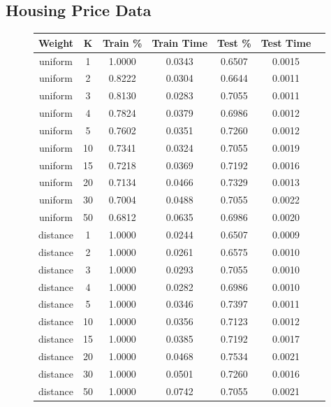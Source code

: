 \documentclass[h]{article}
\begin{document}
\subsection*{Housing Price Data}

\begin{figure}[H]
\begin{tabular}{ | c | c  | c | c | c | c | c |} 
\hline

\textbf{Weight} & \textbf{K} & \textbf{Train \%} & \textbf{Train Time} & \textbf{Test \%} & \textbf{Test Time}   \\ \hline
uniform & 1 & 1.0000 & 0.0343 & 0.6507 & 0.0015 \\ \hline
uniform & 2 & 0.8222 & 0.0304 & 0.6644 & 0.0011 \\ \hline
uniform & 3 & 0.8130 & 0.0283 & 0.7055 & 0.0011 \\ \hline
uniform & 4 & 0.7824 & 0.0379 & 0.6986 & 0.0012 \\ \hline
uniform & 5 & 0.7602 & 0.0351 & 0.7260 & 0.0012 \\ \hline
uniform & 10 & 0.7341 & 0.0324 & 0.7055 & 0.0019 \\ \hline
uniform & 15 & 0.7218 & 0.0369 & 0.7192 & 0.0016 \\ \hline
uniform & 20 & 0.7134 & 0.0466 & 0.7329 & 0.0013 \\ \hline
uniform & 30 & 0.7004 & 0.0488 & 0.7055 & 0.0022 \\ \hline
uniform & 50 & 0.6812 & 0.0635 & 0.6986 & 0.0020 \\ \hline
distance & 1 & 1.0000 & 0.0244 & 0.6507 & 0.0009 \\ \hline
distance & 2 & 1.0000 & 0.0261 & 0.6575 & 0.0010 \\ \hline
distance & 3 & 1.0000 & 0.0293 & 0.7055 & 0.0010 \\ \hline
distance & 4 & 1.0000 & 0.0282 & 0.6986 & 0.0010 \\ \hline
distance & 5 & 1.0000 & 0.0346 & 0.7397 & 0.0011 \\ \hline
distance & 10 & 1.0000 & 0.0356 & 0.7123 & 0.0012 \\ \hline
distance & 15 & 1.0000 & 0.0385 & 0.7192 & 0.0017 \\ \hline
distance & 20 & 1.0000 & 0.0468 & 0.7534 & 0.0021 \\ \hline
distance & 30 & 1.0000 & 0.0501 & 0.7260 & 0.0016 \\ \hline
distance & 50 & 1.0000 & 0.0742 & 0.7055 & 0.0021 \\ \hline


\end{tabular}
\end{figure}
\end{document}
